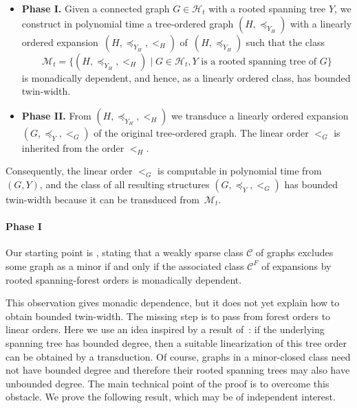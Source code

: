 \documentclass[1p,number,11pt]{elsarticle}
\theoremstyle{plain}
\newcommand{\Cc}{\mathscr{C}}
\newcommand{\Hh}{\mathscr{H}}
\begin{document}
\begin{itemize}
    \item {\bf Phase I.} Given a connected graph $G\in \Hh_t$ with a rooted spanning tree $Y$, we construct in polynomial time a tree-ordered graph $(H,\preceq_{Y_H})$ with a linearly ordered expansion~$(H,\preceq_{Y_H},<_H)$ of~$(H,\preceq_{Y_H})$ such that the class
    \[\mathscr M_t = \{ (H,\preceq_{Y_H},<_H) \mid G\in \mathscr H_t,
    \text{$Y$ is a rooted spanning tree of $G$}\}\]
    is monadically dependent, and hence, as a linearly ordered class, has bounded twin-width.
    
    \item {\bf Phase II.} From $(H,\preceq_{Y_H},<_H)$ we transduce a linearly ordered
  expansion $(G,\preceq_Y,<_G)$ of the original tree-ordered graph. The linear order $<_G$ is
  inherited from the order $<_H$.
\end{itemize}

Consequently, the linear order $<_G$ is computable in polynomial time from $(G,Y)$, and the class of all resulting structures $(G,\preceq_Y,<_G)$ has bounded twin-width because it can be transduced from~$\mathscr M_t$.

\paragraph{Phase I}

Our starting point is , stating that a weakly sparse class $\Cc$ of graphs excludes some graph as a minor if and only if the associated class $\Cc^{F}$ of expansions by rooted spanning-forest orders is monadically dependent.

This observation gives monadic dependence, but it does not yet explain how to obtain bounded twin-width. 
The missing step is to pass from forest orders to linear orders. 
Here we use an idea inspired by a result of~\cite{buffiere2026characterizations}: if the underlying spanning tree has bounded degree, then a suitable linearization of this tree order can be obtained by a transduction. 
Of course, graphs in a minor-closed class need not have bounded degree and therefore their rooted spanning trees may also have unbounded degree. 
The main technical point of the proof is to overcome this obstacle. 
We prove the following result, which may be of independent interest.
\end{document}
